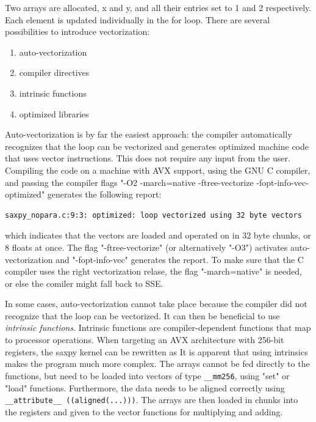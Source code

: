 \noindent Two arrays are allocated, x and y, and all their entries set to 1 and 2 respectively. Each element is updated individually in the for loop. There are several possibilities to introduce vectorization:
\begin{enumerate}
\item auto-vectorization
\item compiler directives
\item intrinsic functions
\item optimized libraries
\end{enumerate}
\noindent Auto-vectorization is by far the easiest approach: the compiler automatically recognizes that the loop can be vectorized and generates optimized machine code that uses vector instructions. This does not require any input from the user. Compiling the code on a machine with AVX support, using the GNU C compiler, and passing the compiler flags "-O2 -march=native -ftree-vectorize -fopt-info-vec-optimized" generates the following report:
\begin{lstlisting}[backgroundcolor=\color{light-gray},breaklines=true]
saxpy_nopara.c:9:3: optimized: loop vectorized using 32 byte vectors
\end{lstlisting}
\noindent which indicates that the vectors are loaded and operated on in 32 byte chunks, or 8 floats at once. The flag "-ftree-vectorize" (or alternatively "-O3") activates auto-vectorization and "-fopt-info-vec" generates the report. To make sure that the C compiler uses the right vectorization relase, the flag "-march=native" is needed, or else the comiler might fall back to SSE. 

In some cases, auto-vectorization cannot take place because the compiler did not recognize that the loop can be vectorized. It can then be beneficial to use \emph{intrinsic functions}. Intrinsic functions are compiler-dependent functions that map to processor operations. When targeting an AVX architecture with 256-bit registers, the saxpy kernel can be rewritten as
\noindent It is apparent that using intrinsics makes the program much more complex. The arrays cannot be fed directly to the functions, but need to be loaded into vectors of type \texttt{\_\_mm256}, using "set" or "load" functions. Furthermore, the data needs to be aligned correctly using \texttt{\_\_attribute\_\_ ((aligned(...)))}. The arrays are then loaded in chunks into the registers and given to the vector functions for multiplying and adding. 

